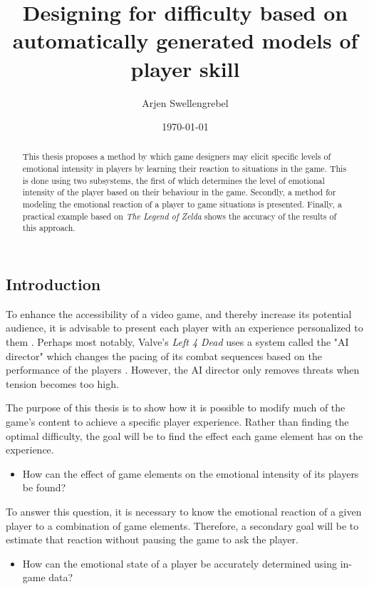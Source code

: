 \documentclass[a4paper]{article}
\title{Designing for difficulty based on automatically generated models of player skill}
\author{Arjen Swellengrebel}
\date{\today}
\begin{document}
\maketitle

\begin{multicols*}{2}
\begin{abstract}
This thesis proposes a method by which game designers may elicit specific levels of emotional intensity in players by learning their reaction to situations in the game.
This is done using two subsystems, the first of which determines the level of emotional intensity of the player based on their behaviour in the game.
Secondly, a method for modeling the emotional reaction of a player to game situations is presented.
Finally, a practical example based on \emph{The Legend of Zelda} shows the accuracy of the results of this approach.
\end{abstract}

\section{Introduction}
To enhance the accessibility of a video game, and thereby increase its potential audience, it is advisable to present each player with an experience personalized to them \cite{playercentered}. Perhaps most notably, Valve's \emph{Left 4 Dead} uses a system called the "AI director" which changes the pacing of its combat sequences based on the performance of the players \cite{left4dead}. However, the AI director only removes threats when tension becomes too high.

The purpose of this thesis is to show how it is possible to modify much of the game's content to achieve a specific player experience. Rather than finding the optimal difficulty, the goal will be to find the effect each game element has on the experience.
\begin{itemize} \item[\textbf{1.}] How can the effect of game elements on the emotional intensity of its players be found? \end{itemize}
To answer this question, it is necessary to know the emotional reaction of a given player to a combination of game elements. Therefore, a secondary goal will be to estimate that reaction without pausing the game to ask the player.
\begin{itemize} \item[\textbf{2.}] How can the emotional state of a player be accurately determined using in-game data? \end{itemize}


\end{multicols*}
\end{document}
